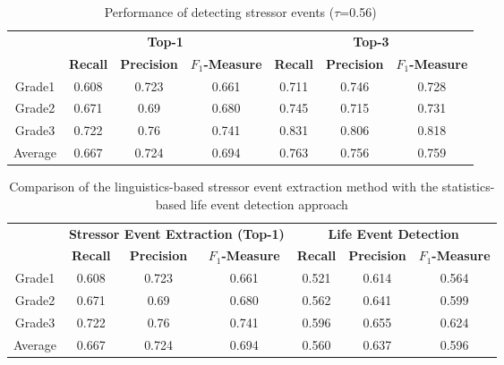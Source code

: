 {\footnotesize
\begin{table}
\begin{center}
\caption{Performance of detecting stressor events ($\tau$=0.56)}
\begin{footnotesize}
\begin{tabular}{|c|c|c|c|c|c|c|} \hline
\multirow{2}{1cm}{}&\multicolumn{3}{c|}{\textbf{Top-1}}&\multicolumn{3}{c|}{\textbf{Top-3}}\\\cline{2-7}
    &\textbf{Recall}&\textbf{Precision}&\textbf{$F_1$-Measure}&\textbf{Recall}&\textbf{Precision} &\textbf{$F_1$-Measure}\\\hline
Grade1  & 0.608 & 0.723 & 0.661 & 0.711 & 0.746 &0.728\\\hline
Grade2	& 0.671 & 0.69 & 0.680 & 0.745 & 0.715 &0.731\\\hline
Grade3	& 0.722	& 0.76	& 0.741 & 0.831 & 0.806 &0.818\\\hline
Average & 0.667 & 0.724 & 0.694 & 0.763 & 0.756 &0.759\\\hline
\end{tabular}
\end{footnotesize}
\label{tab:EventPerformance}
\end{center}
\end{table}
}

{\footnotesize
\begin{table}
\begin{center}
\caption{Comparison of the linguistics-based stressor event extraction method with the statistics-based life event detection approach}
\begin{footnotesize}
\begin{tabular}{|c|c|c|c|c|c|c|} \hline
\multirow{2}{1cm}{}&\multicolumn{3}{c|}{\textbf{Stressor Event Extraction (Top-1)}}&\multicolumn{3}{c|}{\textbf{Life Event Detection}}\\\cline{2-7}
    &\textbf{Recall}&\textbf{Precision}&\textbf{$F_1$-Measure}&\textbf{Recall}&\textbf{Precision}
    &\textbf{$F_1$-Measure}\\\hline
Grade1  & 0.608 & 0.723 & 0.661 &0.521 & 0.614 & 0.564\\\hline
Grade2	& 0.671 & 0.69  & 0.680 &0.562 & 0.641 & 0.599\\\hline
Grade3	& 0.722	& 0.76	& 0.741 &0.596 & 0.655 & 0.624\\\hline
Average & 0.667 & 0.724 & 0.694 &0.560 & 0.637 & 0.596\\\hline
\end{tabular}
\end{footnotesize}
\label{tab:compare}
\end{center}
\end{table}
}

